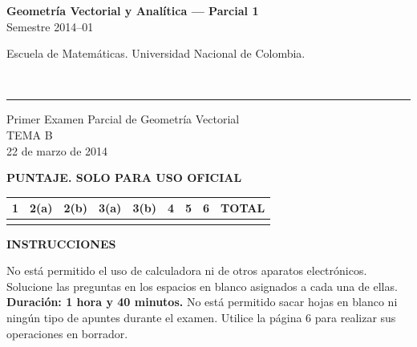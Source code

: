 \documentclass[11pt]{article}
\newcommand{\examheader}{%
  \noindent
  \begin{minipage}[t]{0.6\linewidth}
    {\small\bfseries Geometría Vectorial y Analítica --- Parcial 1}\\
    {\small Semestre 2014--01}
  \end{minipage}%
  \hfill
  \begin{minipage}[t]{0.35\linewidth}
    \raggedleft\small Escuela de Matemáticas. Universidad Nacional de Colombia.
  \end{minipage}\\[2pt]
  \rule{\linewidth}{0.6pt}
}
\begin{document}
\examheader

\begin{center}
{\Large Primer Examen Parcial de Geometría Vectorial}\\[4pt]
{\large TEMA B}\\[4pt]
{\small 22 de marzo de 2014}
\end{center}

\vspace{10pt}
\textbf{PUNTAJE. SOLO PARA USO OFICIAL}

\begin{center}
\begin{tabular}{|c|c|c|c|c|c|c|c|c|}
\hline
1 & 2(a) & 2(b) & 3(a) & 3(b) & 4 & 5 & 6 & TOTAL \\
\hline
 & & & & & & & & \\
\hline
\end{tabular}
\end{center}

\vspace{10pt}
\textbf{INSTRUCCIONES}

No está permitido el uso de calculadora ni de otros aparatos electrónicos. Solucione las preguntas en los espacios en blanco asignados a cada una de ellas. \textbf{Duración: 1 hora y 40 minutos.} No está permitido sacar hojas en blanco ni ningún tipo de apuntes durante el examen. Utilice la página 6 para realizar sus operaciones en borrador.
\end{document}
